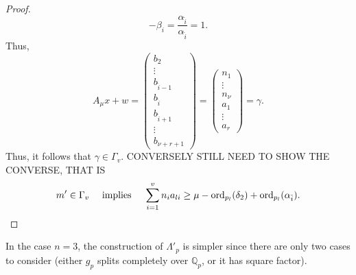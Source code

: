 \begin{proof}
\[-\beta_i = \frac{\alpha_{\hat{i}}}{\alpha_{\hat{i}}} =1.\]
Thus, 
\[A_{\mu}x + w = \begin{pmatrix}
b_2 \\ \vdots \\ b_{\hat{i} -1} \\ b_{\hat{i}} \\ b_{\hat{i} +1} \\ \vdots \\ b_{\nu+r+1}
\end{pmatrix} = 
\begin{pmatrix}
n_1 \\ \vdots \\ n_{\nu} \\ a_1 \\ \vdots \\ a_r \end{pmatrix} = \gamma.\]
Thus, it follows that $\gamma \in \Gamma_v$. 
CONVERSELY STILL NEED TO SHOW THE CONVERSE, THAT IS 
\[m'\in\Gamma_v \quad \text{ implies } \quad \sum_{i = 1}^v n_{i}a_{li}  \geq \mu - \operatorname{ord}_{p_l}(\delta_2) + \operatorname{ord}_{p_l}(\alpha_{\hat{i}}).\]


\end{proof}

\begin{remark}
In the case $n=3$, the construction of $\Lambda'_p$ is simpler since there are only two cases to consider (either $g_p$ splits completely over $\mathbb{Q}_p$, or it has square factor).
\end{remark}


